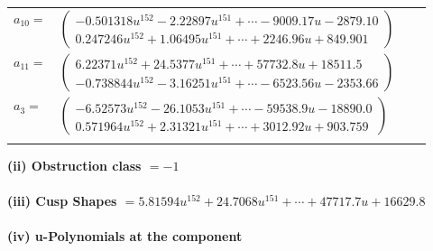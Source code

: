 \documentclass[1p]{elsarticle_modified}
\theoremstyle{definition}
\begin{document}
\begin{tabular}{m{7pt} m{180pt} m{7pt} m{180pt} }
\flushright $a_{10}=$&$\begin{pmatrix}-0.501318 u^{152}-2.22897 u^{151}+\cdots-9009.17 u-2879.10\\0.247246 u^{152}+1.06495 u^{151}+\cdots+2246.96 u+849.901\end{pmatrix}$ \\
\flushright $a_{11}=$&$\begin{pmatrix}6.22371 u^{152}+24.5377 u^{151}+\cdots+57732.8 u+18511.5\\-0.738844 u^{152}-3.16251 u^{151}+\cdots-6523.56 u-2353.66\end{pmatrix}$ \\
\flushright $a_{3}=$&$\begin{pmatrix}-6.52573 u^{152}-26.1053 u^{151}+\cdots-59538.9 u-18890.0\\0.571964 u^{152}+2.31321 u^{151}+\cdots+3012.92 u+903.759\end{pmatrix}$\\&\end{tabular}
\flushleft \textbf{(ii) Obstruction class $= -1$}\\~\\
\flushleft \textbf{(iii) Cusp Shapes $= 5.81594 u^{152}+24.7068 u^{151}+\cdots+47717.7 u+16629.8$}\\~\\
\newpage\renewcommand{\arraystretch}{1}
\flushleft \textbf{(iv) u-Polynomials at the component}\newline \\
\end{document}
